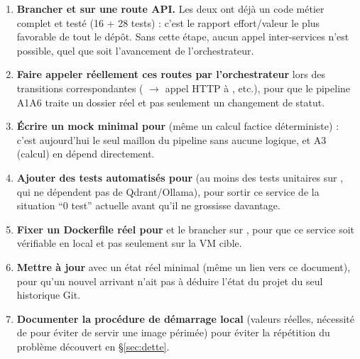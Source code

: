 \documentclass[11pt,a4paper]{article}
\begin{document}
\begin{enumerate}[leftmargin=1.5em]
\item \textbf{Brancher  et  sur une route API.} Les deux ont d\'ej\`a un code m\'etier complet et test\'e (16 + 28 tests) : c'est le rapport effort/valeur le plus favorable de tout le d\'ep\^ot. Sans cette \'etape, aucun appel inter-services n'est possible, quel que soit l'avancement de l'orchestrateur.
\item \textbf{Faire appeler r\'eellement ces routes par l'orchestrateur} lors des transitions correspondantes ( $\to$ appel HTTP \`a , etc.), pour que le pipeline A1\textrightarrow A6 traite un dossier r\'eel et pas seulement un changement de statut.
\item \textbf{\'Ecrire un mock minimal pour } (m\^eme un calcul factice d\'eterministe) : c'est aujourd'hui le seul maillon du pipeline sans aucune logique, et A3 (calcul) en d\'epend directement.
\item \textbf{Ajouter des tests automatis\'es pour } (au moins des tests unitaires sur , qui ne d\'ependent pas de Qdrant/Ollama), pour sortir ce service de la situation ``0 test'' actuelle avant qu'il ne grossisse davantage.
\item \textbf{Fixer un Dockerfile r\'eel pour } et le brancher sur , pour que ce service soit v\'erifiable en local et pas seulement sur la VM cible.
\item \textbf{Mettre \`a jour } avec un \'etat r\'eel minimal (m\^eme un lien vers ce document), pour qu'un nouvel arrivant n'ait pas \`a d\'eduire l'\'etat du projet du seul historique Git.
\item \textbf{Documenter la proc\'edure de d\'emarrage local} (valeurs  r\'eelles, n\'ecessit\'e de  pour \'eviter de servir une image p\'erim\'ee) pour \'eviter la r\'ep\'etition du probl\`eme d\'ecouvert en \S\ref{sec:dette}.
\end{enumerate}
\end{document}
